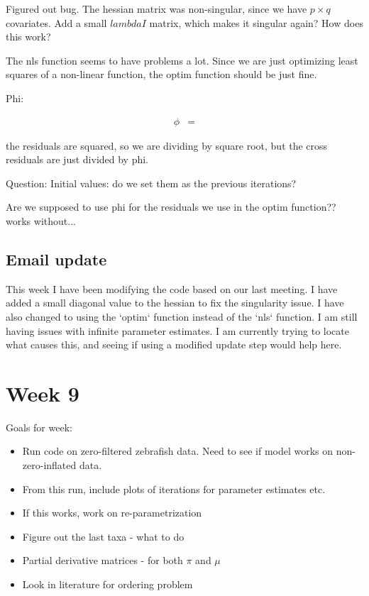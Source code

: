\documentclass[10pt]{article}
\begin{document}
Figured out bug. The hessian matrix was non-singular, since we have $p \times q$ covariates. Add a small $lambda I$ matrix, which makes it singular again? How does this work?

The nls function seems to have problems a lot. Since we are just optimizing least squares of a non-linear function, the optim function should be just fine.

Phi:

\begin{align*}
  \phi &=
\end{align*}

the residuals are squared, so we are dividing by square root, but the cross residuals are just divided by phi.

Question:
Initial values: do we set them as the previous iterations?


Are we supposed to use phi for the residuals we use in the optim function?? works without...



\subsection{Email update}
This week I have been modifying the code based on our last meeting. I have added a small diagonal value to the hessian to fix the singularity issue. I have also changed to using the `optim` function instead of the `nls` function. I am still having issues with infinite parameter estimates. I am currently trying to locate what causes this, and seeing if using a modified update step would help here. 


\section{Week 9}

Goals for week:
\begin{itemize}
  \item Run code on zero-filtered zebrafish data. Need to see if model works on non-zero-inflated data.
  \item From this run, include plots of iterations for parameter estimates etc.
  \item If this works, work on re-parametrization
  \item Figure out the last taxa - what to do
  \item Partial derivative matrices - for both $\pi$ and $\mu$
  \item Look in literature for ordering problem
\end{itemize}
\end{document}
